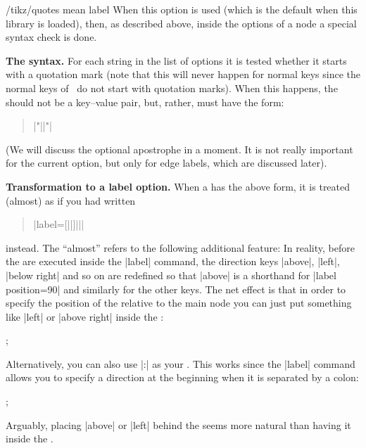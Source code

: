 \begin{key}{/tikz/quotes mean label}
  When this option is used (which is the default when this library is
  loaded), then, as described above, inside the options of a node a
  special syntax check is done.
  
  \medskip
  \noindent\textbf{The syntax.}
  For each string in the list of options
  it is tested whether it starts with a quotation mark (note that this
  will never happen for normal keys since the normal keys of
  \tikzname\ do not start with quotation marks). When this happens,
  the  should not be a key--value pair, but, rather, must
  have the form:
  \begin{quote}
    |"||"|
  \end{quote}

  (We will discuss the optional apostrophe in a moment. It is not
  really important for the current option, but only for
  edge labels, which are discussed later).

  \medskip
  \noindent\textbf{Transformation to a label option.}
  When a  has the above form, it is treated (almost) as
  if you had written
  \begin{quote}
    |label={[||]||}|
  \end{quote}
  instead. The ``almost'' refers to the following additional feature:
  In reality, before the  are executed inside the
  |label| command, the direction keys |above|, |left|, |below right|
  and so on are redefined so that |above| is a shorthand for
  |label position=90| and similarly for the other keys. The net effect
  is that in order to specify the position of the  relative
  to the main node you can just put something like |left| or
  |above right| inside the :
\begin{codeexample}[]
\tikz 
  ;
\end{codeexample}

  Alternatively, you can also use |:| as your . This works since the |label| command
  allows you to specify a direction at the beginning when it is
  separated by a colon:
\begin{codeexample}[]
\tikz 
  ;
\end{codeexample}
  Arguably, placing |above| or |left| behind the  seems
  more natural than having it inside the .


\end{key}
